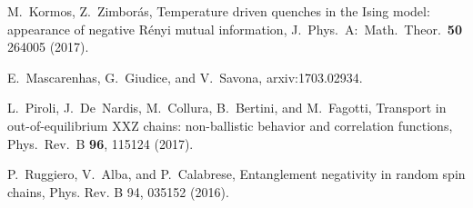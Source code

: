 \documentclass[twocolumn,superscriptaddress,prb,10pt]{revtex4-1}
\begin{document}
\begin{thebibliography}{99}
	M.~Kormos, Z.~Zimbor\'as, Temperature driven quenches in the Ising model: 
	appearance of negative R\'enyi mutual information, J.\ Phys.\ A:\ Math.\ 
	Theor.\ {\bf 50} 264005 (2017). 

E.~Mascarenhas, G.~Giudice, and V.~Savona, arxiv:1703.02934. 


L.~Piroli, J.~De~Nardis, M.~Collura, B.~Bertini, and M.~Fagotti, 
Transport in out-of-equilibrium XXZ chains: non-ballistic behavior and correlation functions, 
Phys.\ Rev.\ B {\bf 96}, 115124 (2017). 

P.~Ruggiero, V.~Alba, and P.~Calabrese, 
Entanglement negativity in random spin chains, Phys. Rev. B 94, 035152 (2016). 






\end{thebibliography}
\end{document}
